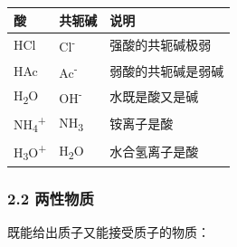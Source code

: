 \documentclass[a4paper,11pt]{ctexart}
\newcounter{none}
\newcommand{\箭}{\ensuremath{\rightarrow}}
\newcommand{\左箭}{\ensuremath{\leftarrow}}
\newcommand{\上箭}{\ensuremath{\uparrow}}
\newcommand{\下箭}{\ensuremath{\downarrow}}
\newcommand{\衡}{\ensuremath{\rightleftharpoons}}
\newcommand{\双箭}{\ensuremath{\leftrightarrow}}
\newcommand{\约等于}{\ensuremath{\approx}}
\newcommand{\小于等于}{\ensuremath{\leq}}
\newcommand{\大于等于}{\ensuremath{\geq}}
\newcommand{\不等于}{\ensuremath{\neq}}
\newcommand{\西格马}{\ensuremath{\sigma}}
\newcommand{\派}{\ensuremath{\pi}}
\begin{document}
{\def\LTcaptype{none} %
\begin{longtable}[]{@{}lll@{}}
\toprule\noalign{}
酸 & 共轭碱 & 说明 \\
\midrule\noalign{}
\endhead
\bottomrule\noalign{}
\endlastfoot
HCl & Cl\textsuperscript{-} & 强酸的共轭碱极弱 \\
HAc & Ac\textsuperscript{-} & 弱酸的共轭碱是弱碱 \\
H\textsubscript{2}O & OH\textsuperscript{-} & 水既是酸又是碱 \\
NH\textsubscript{4}\textsuperscript{+} & NH\textsubscript{3} & 铵离子是酸 \\
H\textsubscript{3}O\textsuperscript{+} & H\textsubscript{2}O & 水合氢离子是酸 \\
\end{longtable}
}

\subsubsection{2.2 两性物质}\label{ux4e24ux6027ux7269ux8d28}

既能给出质子又能接受质子的物质：
\end{document}

